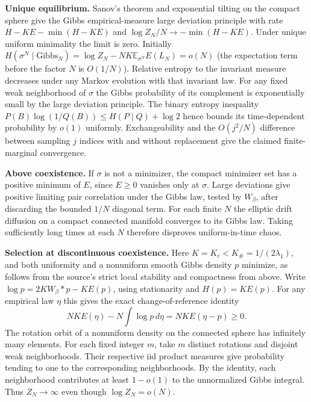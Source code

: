 \documentclass[10pt]{article}
\begin{document}
\textbf{Unique equilibrium.} Sanov's theorem and exponential tilting on the compact sphere give the Gibbs empirical-measure large deviation principle with rate $H-KE-\min(H-KE)$ and $\log Z_N/N\to-\min(H-KE)$. Under unique uniform minimality the limit is zero. Initially $H(\sigma^N\mid\mathrm{Gibbs}_N)=\log Z_N-NK\mathbb E_{\sigma^N}E(L_N)=o(N)$ (the expectation term before the factor $N$ is $O(1/N)$). Relative entropy to the invariant measure decreases under any Markov evolution with that invariant law. For any fixed weak neighborhood of $\sigma$ the Gibbs probability of its complement is exponentially small by the large deviation principle. The binary entropy inequality $P(B)\log(1/Q(B))\le H(P\mid Q)+\log2$ hence bounds its time-dependent probability by $o(1)$ uniformly. Exchangeability and the $O(j^2/N)$ difference between sampling $j$ indices with and without replacement give the claimed finite-marginal convergence.

\textbf{Above coexistence.} If $\sigma$ is not a minimizer, the compact minimizer set has a positive minimum of $E$, since $E\ge0$ vanishes only at $\sigma$. Large deviations give positive limiting pair correlation under the Gibbs law, tested by $W_\beta$, after discarding the bounded $1/N$ diagonal term. For each finite $N$ the elliptic drift diffusion on a compact connected manifold converges to its Gibbs law. Taking sufficiently long times at each $N$ therefore disproves uniform-in-time chaos.

\textbf{Selection at discontinuous coexistence.} Here $K=K_c<K_\#=1/(2\lambda_1)$, and both uniformity and a nonuniform smooth Gibbs density $p$ minimize, as follows from the source's strict local stability and compactness from above. Write $\log p=2K W_\beta*p-K E(p)$, using stationarity and $H(p)=K E(p)$. For any empirical law $\eta$ this gives the exact change-of-reference identity
\[
 NK E(\eta)-N\int\log p\,d\eta= NK E(\eta-p)\ge0 .
\]
The rotation orbit of a nonuniform density on the connected sphere has infinitely many elements. For each fixed integer $m$, take $m$ distinct rotations and disjoint weak neighborhoods. Their respective iid product measures give probability tending to one to the corresponding neighborhoods. By the identity, each neighborhood contributes at least $1-o(1)$ to the unnormalized Gibbs integral. Thus $Z_N\to\infty$ even though $\log Z_N=o(N)$.
\end{document}
